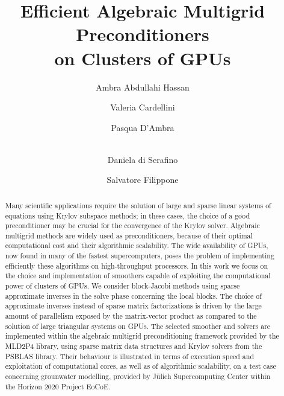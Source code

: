 \documentclass{llncs}
\begin{document}
\title{Efficient Algebraic Multigrid Preconditioners \\on Clusters of GPUs}
%
%
\author{Ambra Abdullahi Hassan%
\and Valeria Cardellini \and Pasqua D'Ambra \and \\ 
Daniela di Serafino \and  Salvatore Filippone}
%
%
\maketitle              %

\begin{abstract}
Many scientific applications require the solution of large and sparse linear systems of equations using Krylov
subspace methods; in these cases, the choice of a good preconditioner may be crucial for the convergence
of the Krylov solver. Algebraic multigrid methods are widely used as preconditioners, because of their optimal
computational cost and their algorithmic scalability. The wide availability of GPUs, now found in many
of the fastest supercomputers, poses the problem of implementing efficiently these algorithms on
high-throughput processors. In this work we focus on the choice and implementation of smoothers capable
of exploiting the computational power of clusters of GPUs. We consider block-Jacobi methods using sparse
approximate inverses in the solve phase concerning the local blocks. The choice of approximate inverses 
instead of sparse matrix factorizations is driven by the large amount of parallelism exposed by the matrix-vector
product as compared to the solution of large triangular systems on GPUs. The selected smoother and solvers are
implemented within the algebraic multigrid preconditioning framework provided by the MLD2P4 library, using sparse
matrix data structures and Krylov solvers from the PSBLAS library. Their behaviour is illustrated
in terms of execution speed and exploitation of computational cores, as well as of algorithmic scalability,
on a test case concerning grounwater modelling, provided by J\"ulich Supercomputing Center within the
Horizon 2020 Project EoCoE.
\end{abstract}
%

%

%

%

%

%
%






\end{document}
